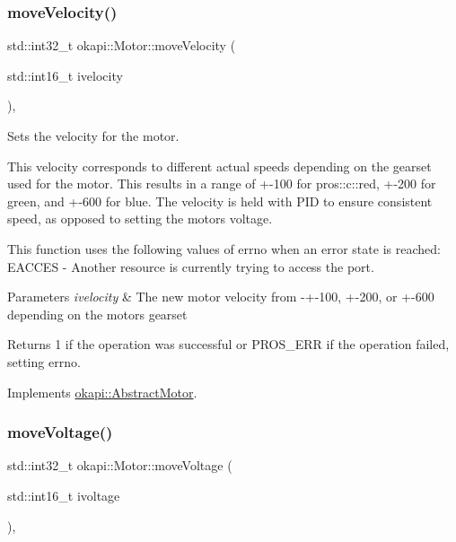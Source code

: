 \mbox{\label{classokapi_1_1Motor_afc3377b9b10a72de0c22e9a74cbcfd16}} 
\subsubsection{\texorpdfstring{moveVelocity()}{moveVelocity()}}
{\footnotesize\ttfamily std\+::int32\+\_\+t okapi\+::\+Motor\+::move\+Velocity (\begin{DoxyParamCaption}\item[{std\+::int16\+\_\+t}]{ivelocity }\end{DoxyParamCaption})\hspace{0.3cm}{\ttfamily [override]}, {\ttfamily [virtual]}}

Sets the velocity for the motor.

This velocity corresponds to different actual speeds depending on the gearset used for the motor. This results in a range of +-\/100 for pros\+::c\+::red, +-\/200 for green, and +-\/600 for blue. The velocity is held with P\+ID to ensure consistent speed, as opposed to setting the motor\textquotesingle{}s voltage.

This function uses the following values of errno when an error state is reached\+: E\+A\+C\+C\+ES -\/ Another resource is currently trying to access the port.


\begin{DoxyParams}{Parameters}
{\em ivelocity} & The new motor velocity from -\/+-\/100, +-\/200, or +-\/600 depending on the motor\textquotesingle{}s gearset \\
\hline
\end{DoxyParams}
\begin{DoxyReturn}{Returns}
1 if the operation was successful or P\+R\+O\+S\+\_\+\+E\+RR if the operation failed, setting errno. 
\end{DoxyReturn}


Implements \mbox{\hyperlink{classokapi_1_1AbstractMotor_a3170268f8d06f728327dcda08505e02b}{okapi\+::\+Abstract\+Motor}}.

\mbox{\label{classokapi_1_1Motor_a64b53a041c90c7b7a3903c607a9b17eb}} 
\subsubsection{\texorpdfstring{moveVoltage()}{moveVoltage()}}
{\footnotesize\ttfamily std\+::int32\+\_\+t okapi\+::\+Motor\+::move\+Voltage (\begin{DoxyParamCaption}\item[{std\+::int16\+\_\+t}]{ivoltage }\end{DoxyParamCaption})\hspace{0.3cm}{\ttfamily [override]}, {\ttfamily [virtual]}}


